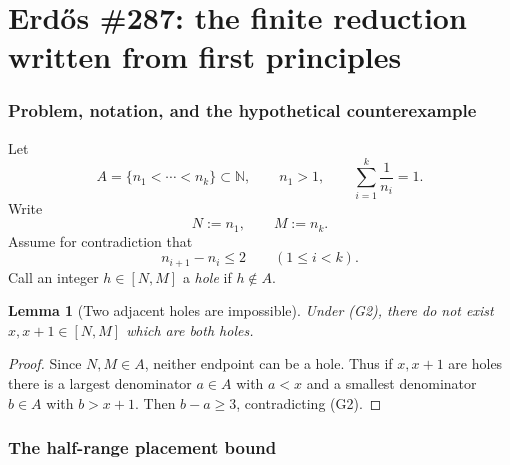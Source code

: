 \documentclass[11pt]{article}
\newtheorem{lemma}[theorem]{Lemma}
\theoremstyle{definition}
\theoremstyle{remark}
\newcommand{\1}{\mathbf 1}
\begin{document}
\begin{abstract}
certificate $g_*$ and arithmetic weight $H_*$.  The fixed-certificate transference identity is valid, but the
resulting leakage family does \emph{not} collapse to only H8/H9 and QK56 packets.  Already the $k=0$, $J=\varnothing$
cell contains an exact smooth-parity packet with the truncated M\"obius divisor detector
$\sum_{d\mid n,\,d\le n^{1/2-\varepsilon_*}}\mu(d)$.  Balanced squarefree cells show nonzero contributions at
orders $7,8,9,10,11,12,\ldots$, so an ``H8/H9-only'' census is false.  The generic seven-prime quadratic-Kummer
estimate remains a useful conditional child provider with relative capacity $X^{-1/18+o(1)}$, but it is no longer
the controlling first wall.  The first literal analytic open in the fixed-certificate route is the source-exact
smooth-parity packet \texttt{287-FIXED-CERTIFICATE-SMOOTH-PARITY45}; the full fixed-certificate leakage estimate
and Problem~\#287 remain open.
\end{abstract}

\tableofcontents
\clearpage

\part{Erd\H{o}s \#287: the finite reduction written from first principles}

\section{Problem, notation, and the hypothetical counterexample}

Let
\[
 A=\{n_1<\cdots<n_k\}\subset\mathbb N,\qquad n_1>1,
 \qquad \sum_{i=1}^k\frac1{n_i}=1.
\]
Write
\[
 N:=n_1,\qquad M:=n_k.
\]
Assume for contradiction that
\[
 n_{i+1}-n_i\le2\qquad(1\le i<k).
\tag{G2}
\]
Call an integer $h\in[N,M]$ a \emph{hole} if $h\notin A$.

\begin{lemma}[Two adjacent holes are impossible]\label{lem:isolated}
Under \emph{(G2)}, there do not exist $x,x+1\in[N,M]$ which are both holes.
\end{lemma}
\begin{proof}
Since $N,M\in A$, neither endpoint can be a hole.  Thus if $x,x+1$ are holes there is a largest denominator
$a\in A$ with $a<x$ and a smallest denominator $b\in A$ with $b>x+1$.  Then $b-a\ge3$, contradicting (G2).
\end{proof}

\section{The half-range placement bound}
\end{document}
